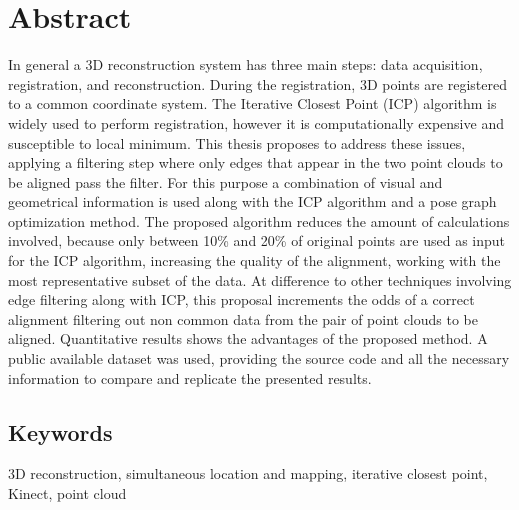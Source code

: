 
\chapter*{Abstract}

In general a 3D reconstruction system has three main steps: data acquisition, registration, and reconstruction. During the registration, 3D points are registered to a common coordinate system. The Iterative Closest Point (ICP) algorithm is widely used to perform registration, however it 
is computationally expensive and susceptible to local minimum. This thesis proposes to address these issues, 
applying a filtering step where only edges that appear 
in the two point clouds to be aligned pass the filter. For this purpose a combination of visual and geometrical information is 
used along with the ICP
  algorithm and a pose graph optimization method. The proposed algorithm reduces the amount of calculations 
involved, because only between 10\% and 20\% of original points are used as input for the ICP algorithm, increasing 
the quality of the alignment, working with the most representative subset of the data. At difference to other techniques 
involving edge filtering along with ICP, this proposal increments the odds of a correct alignment filtering out non common 
data from the pair of point clouds to be aligned. Quantitative results shows the advantages of the proposed method. A 
public available dataset was used, 
providing the source 
code and all the necessary information to compare and replicate the presented results.

\section*{Keywords}

3D reconstruction, simultaneous location and mapping, iterative closest point, Kinect, point cloud
